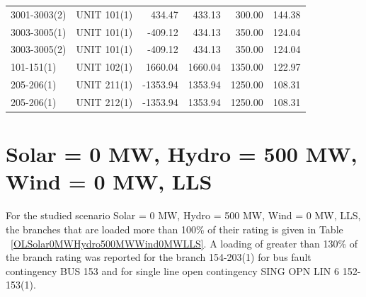 \documentclass[10pt]{report}
\begin{document}
\begin{table}[H]
{\begin{tabular}{llrrrr}
3001-3003(2) & UNIT 101(1) & 434.47 & 433.13 & 300.00 & 144.38 \\
3003-3005(1) & UNIT 101(1) & -409.12 & 434.13 & 350.00 & 124.04 \\
3003-3005(2) & UNIT 101(1) & -409.12 & 434.13 & 350.00 & 124.04 \\
101-151(1) & UNIT 102(1) & 1660.04 & 1660.04 & 1350.00 & 122.97 \\
205-206(1) & UNIT 211(1) & -1353.94 & 1353.94 & 1250.00 & 108.31 \\
205-206(1) & UNIT 212(1) & -1353.94 & 1353.94 & 1250.00 & 108.31 \\
\bottomrule
\end{tabular}}
\end{table}

\section{Solar = 0 MW, Hydro = 500 MW, Wind = 0 MW, LLS}
For the studied scenario Solar = 0 MW, Hydro = 500 MW, Wind = 0 MW, LLS, the branches that are loaded more than 100\% of their rating is given in Table ~\ref{OLSolar0MWHydro500MWWind0MWLLS}. A loading of greater than 130\% of the branch rating was reported for the branch 154-203(1) for bus fault contingency BUS 153 and for single line open contingency SING OPN LIN   6 152-153(1).
\end{document}
